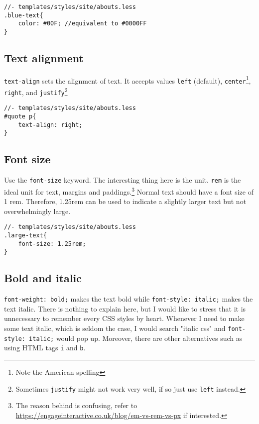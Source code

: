 \begin{lstlisting}
//- templates/styles/site/abouts.less
.blue-text{
    color: #00F; //equivalent to #0000FF
}
\end{lstlisting}

\subsection{Text alignment}

\texttt{text-align} sets the alignment of text. It accepts values \texttt{left} (default), \texttt{center}\footnote{Note the American spelling}, \texttt{right}, and \texttt{justify}\footnote{Sometimes \texttt{justify} might not work very well, if so just use \texttt{left} instead.}

\begin{lstlisting}[language=pug]
//- templates/styles/site/abouts.less
#quote p{
    text-align: right;
}
\end{lstlisting}

\subsection{Font size}

Use the \texttt{font-size} keyword. The interesting thing here is the unit. \texttt{rem} is the ideal unit for text, margins and paddings.\footnote{The reason behind is confusing, refer to \url{https://engageinteractive.co.uk/blog/em-vs-rem-vs-px} if interested.} Normal text should have a font size of 1 rem. Therefore, 1.25rem can be used to indicate a slightly larger text but not overwhelmingly large.

\begin{lstlisting}[language=pug]
//- templates/styles/site/abouts.less
.large-text{
    font-size: 1.25rem;
}
\end{lstlisting}

\subsection{Bold and italic}

\texttt{font-weight: bold;} makes the text bold while \texttt{font-style: italic;} makes the text italic. There is nothing to explain here, but I would like to stress that it is unnecessary to remember every CSS styles by heart. Whenever I need to make some text italic, which is seldom the case, I would search "italic css" and \texttt{font-style: italic;} would pop up. Moreover, there are other alternatives such as using HTML tags \texttt{i} and \texttt{b}.

